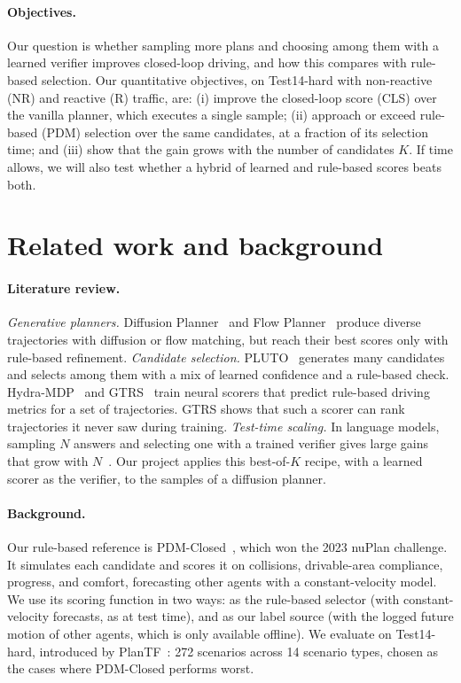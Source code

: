 \documentclass{article}
\begin{document}
\paragraph{Objectives.}
Our question is whether sampling more plans and choosing among them with a learned verifier improves closed-loop driving, and how this compares with rule-based selection. Our quantitative objectives, on Test14-hard with non-reactive (NR) and reactive (R) traffic, are:
(i) improve the closed-loop score (CLS) over the vanilla planner, which executes a single sample;
(ii) approach or exceed rule-based (PDM) selection over the same candidates, at a fraction of its selection time; and
(iii) show that the gain grows with the number of candidates $K$.
If time allows, we will also test whether a hybrid of learned and rule-based scores beats both.

\section{Related work and background}

\paragraph{Literature review.}
\emph{Generative planners.} Diffusion Planner~\cite{zheng2025diffusion} and Flow Planner~\cite{tan2025flow} produce diverse trajectories with diffusion or flow matching, but reach their best scores only with rule-based refinement.
\emph{Candidate selection.} PLUTO~\cite{cheng2024pluto} generates many candidates and selects among them with a mix of learned confidence and a rule-based check. Hydra-MDP~\cite{li2024hydra} and GTRS~\cite{li2025gtrs} train neural scorers that predict rule-based driving metrics for a set of trajectories. GTRS shows that such a scorer can rank trajectories it never saw during training.
\emph{Test-time scaling.} In language models, sampling $N$ answers and selecting one with a trained verifier gives large gains that grow with $N$~\cite{cobbe2021verifiers}. Our project applies this best-of-$K$ recipe, with a learned scorer as the verifier, to the samples of a diffusion planner.

\paragraph{Background.}
Our rule-based reference is PDM-Closed~\cite{dauner2023parting}, which won the 2023 nuPlan challenge. It simulates each candidate and scores it on collisions, drivable-area compliance, progress, and comfort, forecasting other agents with a constant-velocity model. We use its scoring function in two ways: as the rule-based selector (with constant-velocity forecasts, as at test time), and as our label source (with the logged future motion of other agents, which is only available offline). We evaluate on Test14-hard, introduced by PlanTF~\cite{cheng2024plantf}: 272 scenarios across 14 scenario types, chosen as the cases where PDM-Closed performs worst.
\end{document}
